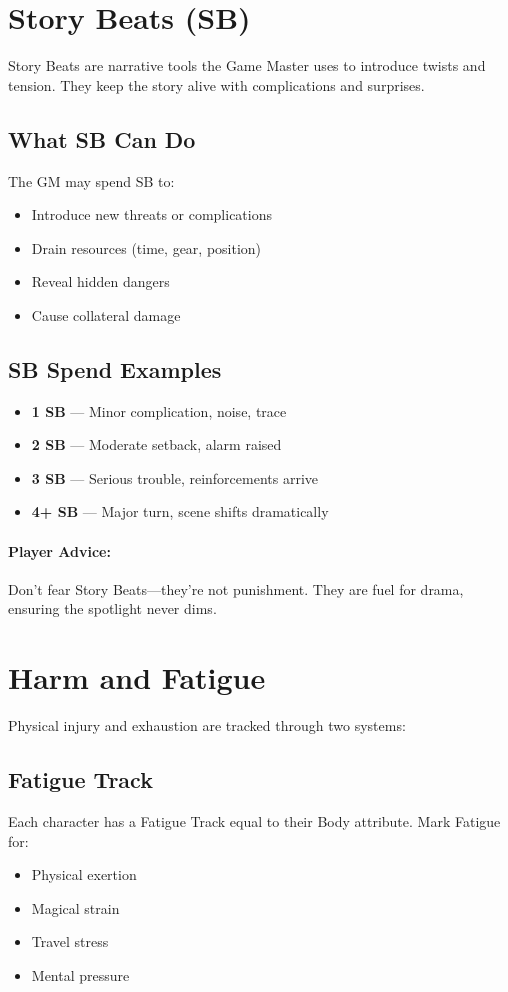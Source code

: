 \section{Story Beats (SB)} 

Story Beats are narrative tools the Game Master uses to introduce twists and tension. They keep the story alive with complications and surprises.

\subsection*{What SB Can Do}
The GM may spend SB to:
\begin{itemize}
  \item Introduce new threats or complications
  \item Drain resources (time, gear, position)
  \item Reveal hidden dangers
  \item Cause collateral damage
\end{itemize}

\subsection*{SB Spend Examples}
\begin{itemize}
  \item \textbf{1 SB} — Minor complication, noise, trace
  \item \textbf{2 SB} — Moderate setback, alarm raised
  \item \textbf{3 SB} — Serious trouble, reinforcements arrive
  \item \textbf{4+ SB} — Major turn, scene shifts dramatically
\end{itemize}

\paragraph{Player Advice:}  
Don't fear Story Beats—they're not punishment. They are fuel for drama, ensuring the spotlight never dims.

\section{Harm and Fatigue} 

Physical injury and exhaustion are tracked through two systems:

\subsection*{Fatigue Track}
Each character has a Fatigue Track equal to their Body attribute. Mark Fatigue for:
\begin{itemize}
  \item Physical exertion
  \item Magical strain
  \item Travel stress
  \item Mental pressure
\end{itemize}

